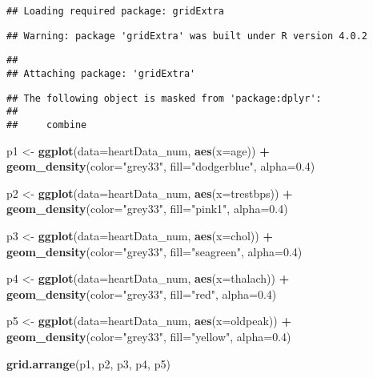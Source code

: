 \documentclass[
]{article}
\newenvironment{Shaded}{\begin{snugshade}}{\end{snugshade}}
\newcommand{\DataTypeTok}[1]{\textcolor[rgb]{0.13,0.29,0.53}{#1}}
\newcommand{\FloatTok}[1]{\textcolor[rgb]{0.00,0.00,0.81}{#1}}
\newcommand{\KeywordTok}[1]{\textcolor[rgb]{0.13,0.29,0.53}{\textbf{#1}}}
\newcommand{\NormalTok}[1]{#1}
\newcommand{\OperatorTok}[1]{\textcolor[rgb]{0.81,0.36,0.00}{\textbf{#1}}}
\newcommand{\StringTok}[1]{\textcolor[rgb]{0.31,0.60,0.02}{#1}}
\begin{document}
\begin{verbatim}
## Loading required package: gridExtra
\end{verbatim}

\begin{verbatim}
## Warning: package 'gridExtra' was built under R version 4.0.2
\end{verbatim}

\begin{verbatim}
## 
## Attaching package: 'gridExtra'
\end{verbatim}

\begin{verbatim}
## The following object is masked from 'package:dplyr':
## 
##     combine
\end{verbatim}

\begin{Shaded}
\begin{Highlighting}[]
\NormalTok{p1 <-}\StringTok{ }\KeywordTok{ggplot}\NormalTok{(}\DataTypeTok{data=}\NormalTok{heartData_num, }\KeywordTok{aes}\NormalTok{(}\DataTypeTok{x=}\NormalTok{age)) }\OperatorTok{+}
\StringTok{    }\KeywordTok{geom_density}\NormalTok{(}\DataTypeTok{color=}\StringTok{"grey33"}\NormalTok{, }\DataTypeTok{fill=}\StringTok{"dodgerblue"}\NormalTok{, }\DataTypeTok{alpha=}\FloatTok{0.4}\NormalTok{)}

\NormalTok{p2 <-}\StringTok{ }\KeywordTok{ggplot}\NormalTok{(}\DataTypeTok{data=}\NormalTok{heartData_num, }\KeywordTok{aes}\NormalTok{(}\DataTypeTok{x=}\NormalTok{trestbps)) }\OperatorTok{+}
\StringTok{    }\KeywordTok{geom_density}\NormalTok{(}\DataTypeTok{color=}\StringTok{"grey33"}\NormalTok{, }\DataTypeTok{fill=}\StringTok{"pink1"}\NormalTok{, }\DataTypeTok{alpha=}\FloatTok{0.4}\NormalTok{)}

\NormalTok{p3 <-}\StringTok{ }\KeywordTok{ggplot}\NormalTok{(}\DataTypeTok{data=}\NormalTok{heartData_num, }\KeywordTok{aes}\NormalTok{(}\DataTypeTok{x=}\NormalTok{chol)) }\OperatorTok{+}
\StringTok{    }\KeywordTok{geom_density}\NormalTok{(}\DataTypeTok{color=}\StringTok{"grey33"}\NormalTok{, }\DataTypeTok{fill=}\StringTok{"seagreen"}\NormalTok{, }\DataTypeTok{alpha=}\FloatTok{0.4}\NormalTok{)}

\NormalTok{p4 <-}\StringTok{ }\KeywordTok{ggplot}\NormalTok{(}\DataTypeTok{data=}\NormalTok{heartData_num, }\KeywordTok{aes}\NormalTok{(}\DataTypeTok{x=}\NormalTok{thalach)) }\OperatorTok{+}
\StringTok{    }\KeywordTok{geom_density}\NormalTok{(}\DataTypeTok{color=}\StringTok{"grey33"}\NormalTok{, }\DataTypeTok{fill=}\StringTok{"red"}\NormalTok{, }\DataTypeTok{alpha=}\FloatTok{0.4}\NormalTok{)}

\NormalTok{p5 <-}\StringTok{ }\KeywordTok{ggplot}\NormalTok{(}\DataTypeTok{data=}\NormalTok{heartData_num, }\KeywordTok{aes}\NormalTok{(}\DataTypeTok{x=}\NormalTok{oldpeak)) }\OperatorTok{+}
\StringTok{    }\KeywordTok{geom_density}\NormalTok{(}\DataTypeTok{color=}\StringTok{"grey33"}\NormalTok{, }\DataTypeTok{fill=}\StringTok{"yellow"}\NormalTok{, }\DataTypeTok{alpha=}\FloatTok{0.4}\NormalTok{)}


\KeywordTok{grid.arrange}\NormalTok{(p1, p2, p3, p4, p5)}
\end{Highlighting}
\end{Shaded}
\end{document}
